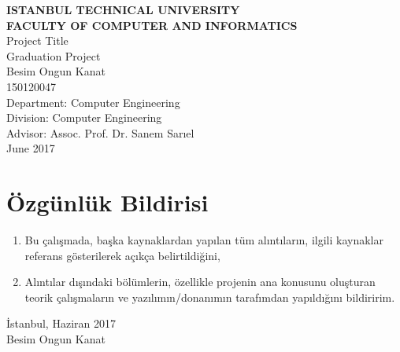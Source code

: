 \documentclass[a4paper, 12pt, titlepage]{article}
\title{\thetitle}
\author{\theauthor}
\date{\thedate}
\newcommand{\thetitle}{Project Title}
\newcommand{\theauthor}{Besim Ongun Kanat}
\newcommand{\thedate}{June 2017}
\newcommand{\theturkishdate}{Haziran 2017}
\begin{document}
\shorthandoff{=}


\begin{titlepage}
    \bfseries %
    \sffamily %
    \begin{center}
        \LARGE{\textbf{ISTANBUL TECHNICAL UNIVERSITY \\ 
               FACULTY OF COMPUTER AND INFORMATICS} } \\
        \vspace{5.5cm}
        \LARGE{\thetitle}  \\
        \vspace{4.5cm}
        \Large{Graduation Project} \\
        \vspace{0.5cm}
        \Large{\theauthor} \\
        \Large{150120047} \\
        \vspace{4cm}
        \large{Department: Computer Engineering} \\
        \large{Division: Computer Engineering} \\
        \vspace{1.5cm}
        \large{Advisor: Assoc. Prof. Dr. Sanem Sarıel} \\
        \vspace{\fill} %
        \large{\normalfont \sffamily \thedate}
    \end{center}
\end{titlepage}

\newpage
\section*{Özgünlük Bildirisi}
\begin{enumerate}
    \item Bu çalışmada, başka kaynaklardan yapılan tüm alıntıların, ilgili kaynaklar \\ referans gösterilerek açıkça belirtildiğini,
    \item Alıntılar dışındaki bölümlerin, özellikle projenin ana konusunu oluşturan teorik çalışmaların ve yazılımın/donanımın tarafımdan yapıldığını
    bildiririm.
\end{enumerate}
\vspace{1em}
İstanbul, \theturkishdate
\vspace{3em}\\ \theauthor
\end{document}
